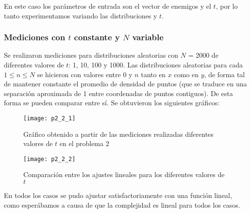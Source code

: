 En este caso los parámetros de entrada son el vector de enemigos y el $t$, por lo tanto experimentamos variando las distribuciones y $t$.





\subsubsection{Mediciones con $t$ constante y $N$ variable}

Se realizaron mediciones para distribuciones aleatorias con $N$ = 2000 de diferentes valores de $t$: 1, 10, 100 y 1000. Las distribuciones aleatorias para cada $1 \leq n \leq N$ se hicieron con valores entre 0 y $n$ tanto en $x$ como en $y$, de forma tal de mantener constante el promedio de densidad de puntos (que se traduce en una separación aproximada de 1 entre coordenadas de puntos contiguos). De esta forma se pueden comparar entre sí. Se obtuvieron los siguientes gráficos:

\begin{figure}[h!]
\texttt{[image: p2\_2\_1]}
\caption{Gráfico obtenido a partir de las mediciones realizadas diferentes valores de $t$ en el problema 2}
\end{figure}

\begin{figure}[h!]
\texttt{[image: p2\_2\_2]}
\caption{Comparación entre los ajustes lineales para los diferentes valores de $t$}
\end{figure}

En todos los casos se pudo ajustar satisfactoriamente con una función lineal, como esperábamos a causa de que la complejidad es lineal para todos los casos.

